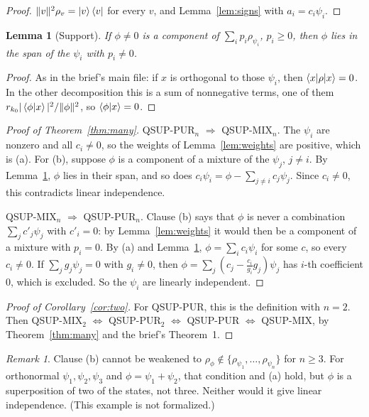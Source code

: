 \documentclass[11pt]{article}
\newtheorem{lemma}[theorem]{Lemma}
\theoremstyle{definition}
\theoremstyle{remark}
\newtheorem{remark}[theorem]{Remark}
\begin{document}
\begin{proof}
  $\|v\|^2\rho_v = \ket v\bra v$ for every $v$, and Lemma~\ref{lem:signs} with $a_i = c_i\psi_i$.
\end{proof}

\begin{lemma}[Support]\label{lem:support}
  If $\phi \ne 0$ is a component of $\sum_i p_i\rho_{\psi_i}$, $p_i \ge 0$, then $\phi$ lies in
  the span of the $\psi_i$ with $p_i \ne 0$.
\end{lemma}

\begin{proof}
  As in the brief's main file: if $x$ is orthogonal to those $\psi_i$, then
  $\braket{x|\rho|x} = 0$. In the other decomposition this is a sum of nonnegative terms, one of
  them $r_{k_0}|\braket{\phi|x}|^2/\|\phi\|^2$, so $\braket{\phi|x} = 0$.
\end{proof}

\begin{proof}[Proof of Theorem~\ref{thm:many}]
  QSUP-PUR$_n$ $\Rightarrow$ QSUP-MIX$_n$. The $\psi_i$ are nonzero and all $c_i \ne 0$, so the
  weights of Lemma~\ref{lem:weights} are positive, which is (a). For (b), suppose $\phi$ is a
  component of a mixture of the $\psi_j$, $j \ne i$. By Lemma~\ref{lem:support}, $\phi$ lies in
  their span, and so does $c_i\psi_i = \phi - \sum_{j \ne i} c_j\psi_j$. Since $c_i \ne 0$, this
  contradicts linear independence.

  QSUP-MIX$_n$ $\Rightarrow$ QSUP-PUR$_n$. Clause (b) says that $\phi$ is never a combination
  $\sum_j c'_j\psi_j$ with $c'_i = 0$: by Lemma~\ref{lem:weights} it would then be a component of a
  mixture with $p_i = 0$. By (a) and Lemma~\ref{lem:support}, $\phi = \sum_i c_i\psi_i$ for some
  $c$, so every $c_i \ne 0$. If $\sum_j g_j\psi_j = 0$ with $g_i \ne 0$, then
  $\phi = \sum_j (c_j - \tfrac{c_i}{g_i}g_j)\psi_j$ has $i$-th coefficient $0$, which is excluded.
  So the $\psi_i$ are linearly independent.
\end{proof}

\begin{proof}[Proof of Corollary~\ref{cor:two}]
  For QSUP-PUR, this is the definition with $n = 2$. Then QSUP-MIX$_2$ $\Leftrightarrow$ QSUP-PUR$_2$
  $\Leftrightarrow$ QSUP-PUR $\Leftrightarrow$ QSUP-MIX, by Theorem~\ref{thm:many} and the brief's
  Theorem~1.
\end{proof}

\begin{remark}
  Clause (b) cannot be weakened to $\rho_\phi \notin \{\rho_{\psi_1}, \dots, \rho_{\psi_n}\}$
  for $n \ge 3$. For orthonormal $\psi_1, \psi_2, \psi_3$ and $\phi = \psi_1 + \psi_2$, that
  condition and (a) hold, but $\phi$ is a superposition of two of the states, not three. Neither
  would it give linear independence. (This example is not formalized.)
\end{remark}
\end{document}
